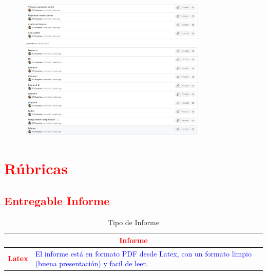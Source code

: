 \documentclass{article}
\begin{document}
    \begin{figure}[H]
		      \centering
                \includegraphics[width=0.8\textwidth,keepaspectratio]{img/c3.jpeg}
	   \end{figure}

    


		

	\section{\textcolor{red}{Rúbricas}}
	
	\subsection{\textcolor{red}{Entregable Informe}}
	\begin{table}[H]
		\caption{Tipo de Informe}
		\setlength{\tabcolsep}{0.5em} %
		{\renewcommand{\arraystretch}{1.5}%
		\begin{tabular}{|p{3cm}|p{12cm}|}
			\hline
			\multicolumn{2}{|c|}{\textbf{\textcolor{red}{Informe}}}  \\
			\hline 
			\textbf{\textcolor{red}{Latex}} & \textcolor{blue}{El informe está en formato PDF desde Latex,  con un formato limpio (buena presentación) y facil de leer.}   \\ 
			\hline 
			
			
		\end{tabular}
	}
	\end{table}
	
	\clearpage
	
\end{document}
